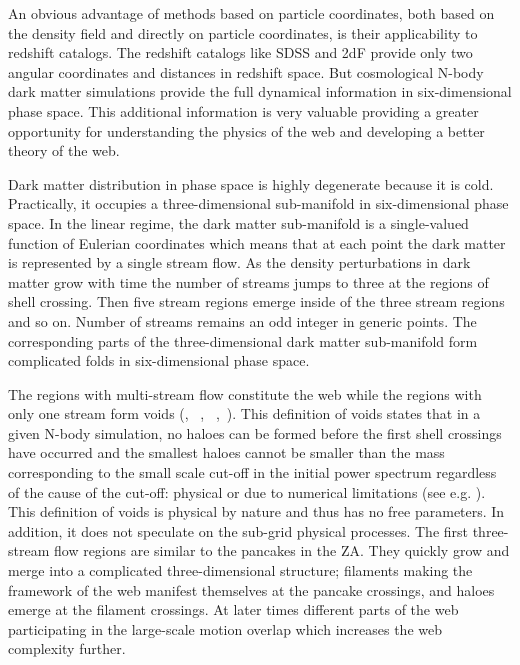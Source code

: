 An obvious advantage of methods based on particle coordinates, both based on the density field and directly on particle coordinates, is their applicability to redshift catalogs. 
The redshift catalogs like SDSS and 2dF provide only two angular coordinates and distances in redshift space. 
But cosmological N-body dark matter simulations provide the full dynamical information in six-dimensional
phase space. This additional information is very valuable providing a greater opportunity for understanding the 
physics of the web and developing a better theory of the web.

Dark matter distribution in phase space is highly degenerate because it is cold. 
Practically, it occupies a three-dimensional sub-manifold in six-dimensional phase space.
 In the linear regime, the dark matter sub-manifold is a single-valued function of Eulerian coordinates 
 which means that at each point the dark matter is represented by a single stream flow. As the density perturbations in dark matter grow with time the number of streams jumps to three at the regions of
shell crossing. Then five stream regions emerge inside of the three stream regions and so on.
Number of streams remains an odd integer in generic points.   The corresponding parts of the three-dimensional dark matter sub-manifold 
form complicated folds in six-dimensional  phase space.   

The regions with multi-stream flow constitute the web while the regions with only one stream form
voids (\citealt{Shandarin2011}, ~\citealt{Shandarin2012}, ~\citealt{Abel2012},~\citealt{Falck2012}).
This definition of voids states that in a given N-body simulation, no haloes can be formed before the first
shell crossings have occurred and the smallest haloes cannot be smaller than the mass corresponding 
to the small scale cut-off in the initial power spectrum regardless of the cause of the cut-off:  physical or due to numerical
limitations (see e.g. \citealt{Angulo2013}).  This definition of voids is physical by nature and thus has no  free parameters. In addition, it does not speculate on the sub-grid physical processes.
The first three-stream flow regions are similar to the pancakes in the ZA.
They quickly grow and merge into a complicated three-dimensional structure; filaments making the framework of the web manifest 
themselves at the pancake crossings,  and haloes emerge at the filament crossings. At later times  different parts of the web participating
in the large-scale motion overlap  which increases the web complexity further.

